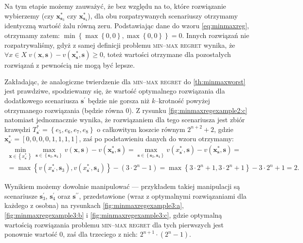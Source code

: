 Na tym etapie możemy zauważyć, że bez względu na to, które rozwiązanie wybierzemy (czy $\textbf{x}^{\ast}_{\textbf{s}_{3}}$ czy $\textbf{x}^{\ast}_{\textbf{s}_{4}}$), dla obu rozpatrywanych scenariuszy otrzymamy identyczną wartość żalu równą zeru. Podstawiając dane do wzoru \ref{eq:minmaxreg}, otrzymamy zatem: $\min \left\{ \max \left\{ 0, 0 \right\} , \max \left\{ 0, 0 \right\} \right\} = 0$. Innych rozwiązań nie rozpatrywaliśmy, gdyż z samej definicji problemu \textsc{min--max regret} wynika, że $\forall x \in X \; v \left( \textbf{x}, \textbf{s} \right) - v \left( \textbf{x}^{\ast}_{\textbf{s}}, \textbf{s} \right) \geqslant 0$, toteż wartości otrzymane dla pozostałych rozwiązań z pewnością nie mogą być lepsze.

Zakładając, że analogiczne twierdzenie dla \textsc{min--max regret} do \ref{th:minmaxworst} jest prawdziwe, spodziewamy się, że wartość optymalnego rozwiązania dla dodatkowego scenariusza $\textbf{s}^{\prime}$ będzie nie gorsza niż $k$--krotność powyżej otrzymanego rozwiązania (będzie równa $0$). Z rysunku \ref{fig:minmaxregexample2:c} natomiast jednoznacznie wynika, że rozwiązaniem dla tego scenariusza jest zbiór krawędzi $T^{\ast}_{\textbf{s}^{\prime}} = \left\{ e_{5}, e_{6}, e_{7}, e_{8} \right\}$ o całkowitym koszcie równym $2^{n+2} + 2$, gdzie $\textbf{x}^{\ast}_{\textbf{s}^{\prime}} = \left[ 0, 0, 0, 0, 1, 1, 1, 1 \right]$, zaś po podstawieniu danych do wzoru otrzymamy:
\begin{gather*}
	\min_{\textbf{x} \in \left\{ x^{\ast}_{\textbf{s}^{\prime}} \right\}} \max_{\textbf{s} \in \left\{ \textbf{s}_{3}, \textbf{s}_{4} \right\}} v \left( \textbf{x}, \textbf{s} \right) - v \left( \textbf{x}^{\ast}_{\textbf{s}}, \textbf{s} \right) = \max_{\textbf{s} \in \left\{ \textbf{s}_{3}, \textbf{s}_{4} \right\}} v \left( x^{\ast}_{\textbf{s}^{\prime}}, \textbf{s} \right) - v \left( \textbf{x}^{\ast}_{\textbf{s}}, \textbf{s} \right) = \\ = \max \left\{ v \left( x^{\ast}_{\textbf{s}^{\prime}}, \textbf{s}_{3} \right), v \left( x^{\ast}_{\textbf{s}^{\prime}}, \textbf{s}_{4} \right) \right\} - \left( 3 \cdot 2^{n} - 1 \right) = \max \left\{ 3 \cdot 2^{n} + 1, 3 \cdot 2^{n} + 1 \right\} - 3 \cdot 2^{n} + 1 = 2\text{.}
\end{gather*}

Wynikiem możemy dowolnie manipulować --- przykładem takiej manipulacji są scenariusze $\textbf{s}^{\prime}_{3}$, $\textbf{s}^{\prime}_{4}$ oraz $\textbf{s}^{\prime\prime}$, przedstawione (wraz z optymalnymi rozwiązaniami dla każdego z osobna) na rysunkach \ref{fig:minmaxregexample3:a}, \ref{fig:minmaxregexample3:b} i \ref{fig:minmaxregexample3:c}, gdzie optymalną wartością rozwiązania problemu \textsc{min--max regret} dla tych pierwszych jest ponownie wartość $0$, zaś dla trzeciego z nich: $2^{n+1} \cdot \left( 2^{n} - 1\right)$.

